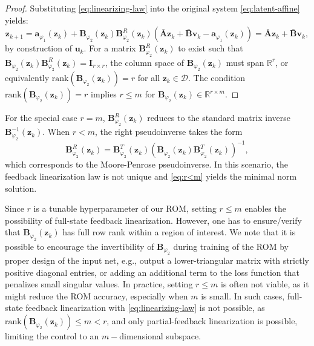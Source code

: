 \documentclass{article}
\begin{document}
\begin{proof}
Substituting \eqref{eq:linearizing-law} into the original system \eqref{eq:latent-affine} yields:
\begin{equation*}
\label{eq:proof-FL}
    \mathbf{z}_{k+1}=\mathbf{a}_{\varphi_1}(\mathbf{z}_k)+\mathbf{B}_{\varphi_2}(\mathbf{z}_k)\mathbf{B}^{R}_{\varphi_2}(\mathbf{z}_k)(\bar{\mathbf{A}}\mathbf{z}_{k} + \bar{\mathbf{B}}\mathbf{v}_k - \mathbf{a}_{\varphi_1}(\mathbf{z}_k)) = \bar{\mathbf{A}}\mathbf{z}_{k} + \bar{\mathbf{B}}\mathbf{v}_k,
\end{equation*}
by construction of $\mathbf{u}_k$.
For a matrix $\mathbf{B}^{R}_{\varphi_2}(\mathbf{z}_k)$ to exist such that $\mathbf{B}_{\varphi_2}(\mathbf{z}_k)\mathbf{B}^{R}_{\varphi_2}(\mathbf{z}_k)=\mathbf{I}_{r \times r}$, the column space of $\mathbf{B}_{\varphi_2}(\mathbf{z}_k)$ must span $\mathbb{R}^r$, or equivalently $\text{rank}(\mathbf{B}_{\varphi_2}(\mathbf{z}_k))=r$ for all $\mathbf{z}_k \in \mathcal{D}$.
The condition $\text{rank}(\mathbf{B}_{\varphi_2}(\mathbf{z}_k))=r$ implies $r \le m$ for $\mathbf{B}_{\varphi_2}(\mathbf{z}_k) \in \mathbb{R}^{r \times m}$.
\end{proof}
For the special case $r=m$, $\mathbf{B}^{R}_{\varphi_2}(\mathbf{z}_k)$ reduces to the standard matrix inverse $\mathbf{B}^{-1}_{\varphi_2}(\mathbf{z}_k)$.
When $r<m$, the right pseudoinverse takes the form
\begin{equation}
    \label{eq:r<m}
    \mathbf{B}^{R}_{\varphi_2}(\mathbf{z}_k)=\mathbf{B}^{T}_{\varphi_2}(\mathbf{z}_k)(\mathbf{B}_{\varphi_2}(\mathbf{z}_k)\mathbf{B}^{T}_{\varphi_2}(\mathbf{z}_k))^{-1},
\end{equation}
which corresponds to the Moore-Penrose pseudoinverse.
In this scenario, the feedback linearization law is not unique and \eqref{eq:r<m} yields the minimal norm solution.

Since $r$ is a tunable hyperparameter of our ROM, setting $r\le m$ enables the possibility of full-state feedback linearization.
However, one has to ensure/verify that $\mathbf{B}_{\varphi_2}(\mathbf{z}_k)$ has full row rank within a region of interest.
We note that it is possible to encourage the invertibility of $\mathbf{B}_{\varphi_2}$ during training of the ROM by proper design of the input net, e.g., output a lower-triangular matrix with strictly positive diagonal entries, or adding an additional term to the loss function that penalizes small singular values.
In practice, setting $r \le m$ is often not viable, as it might reduce the ROM accuracy, especially when $m$ is small.
In such cases, full-state feedback linearization with \eqref{eq:linearizing-law} is not possible, as $\text{rank}(\mathbf{B}_{\varphi_2}(\mathbf{z}_k)) \le m <r$, and only partial-feedback linearization is possible, limiting the control to an $m-$dimensional subspace.
\end{document}
